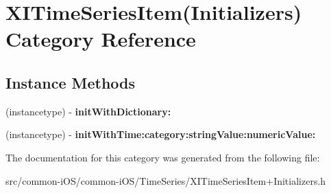 \hypertarget{category_x_i_time_series_item_07_initializers_08}{}\section{X\+I\+Time\+Series\+Item(Initializers) Category Reference}
\label{category_x_i_time_series_item_07_initializers_08}
\subsection*{Instance Methods}
\begin{DoxyCompactItemize}
\item 
\hypertarget{category_x_i_time_series_item_07_initializers_08_a4a0771ae9fa6d549c19fe4cb7e272975}{}\label{category_x_i_time_series_item_07_initializers_08_a4a0771ae9fa6d549c19fe4cb7e272975} 
(instancetype) -\/ {\bfseries init\+With\+Dictionary\+:}
\item 
\hypertarget{category_x_i_time_series_item_07_initializers_08_a9efaec12739cff8db3035d2ae89c5a66}{}\label{category_x_i_time_series_item_07_initializers_08_a9efaec12739cff8db3035d2ae89c5a66} 
(instancetype) -\/ {\bfseries init\+With\+Time\+:category\+:string\+Value\+:numeric\+Value\+:}
\end{DoxyCompactItemize}


The documentation for this category was generated from the following file\+:\begin{DoxyCompactItemize}
\item 
src/common-\/i\+O\+S/common-\/i\+O\+S/\+Time\+Series/X\+I\+Time\+Series\+Item+\+Initializers.\+h\end{DoxyCompactItemize}
